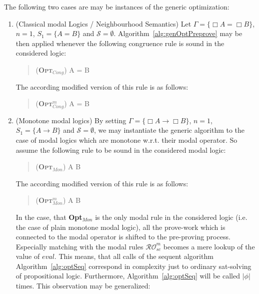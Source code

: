 \documentclass{entcs} \usepackage{entcsmacro}
\begin{document}
\begin{example}
The following two cases are may be instances of the generic optimization:
\begin{enumerate}
\item (Classical modal Logics / Neighbourhood Semantics) Let $\Gamma = \{\Box A = \Box B\}$,
$n=1$, $S_1=\{A=B\}$ and $\mathcal{S}=\emptyset$. Algorithm~\ref{alg:genOptPreprove}
may be then applied whenever the following congruence rule is sound in the considered
logic:
\begin{quote}
\begin{center}
      (\textsc {\textbf{Opt}$_{Cong}$}) 
                      { \Box A = \Box B }
  \end{center}
\end{quote}
The according modified version of this rule is as follows:
\begin{quote}
\begin{center}
      (\textsc {\textbf{Opt}$^m_{Cong}$}) 
                      { \Box A = \Box B }
  \end{center}
\end{quote}

\item (Monotone modal logics) By setting $\Gamma = \{\Box A \rightarrow \Box B\}$,
$n=1$, $S_1=\{A\rightarrow B\}$ and $\mathcal{S}=\emptyset$, we may instantiate
the generic algorithm to the case of modal logics which are monotone w.r.t. their
modal operator. So assume the following rule to be sound in  the considered modal
logic:
\begin{quote}
\begin{center}
      (\textsc {\textbf{Opt}$_{Mon}$}) 
                      { \Box A \rightarrow \Box B }
  \end{center}
\end{quote}
The according modified version of this rule is as follows:
\begin{quote}
\begin{center}
      (\textsc {\textbf{Opt}$^m_{Mon}$}) 
                      { \Box A \rightarrow \Box B }
  \end{center}
\end{quote}
In the case, that \textbf{Opt}$_{Mon}$ is the only modal rule in the
considered logic (i.e. the case of plain monotone modal logic), all the
prove-work which is connected to the modal operator is shifted to the
pre-proving process. Especially matching with the modal rules
$\mathcal{RO}^m_{sc}$ becomes a mere lookup of the value of $eval$.
This means, that all calls of the sequent algorithm Algorithm~\ref{alg:optSeq}
correspond in complexity just to ordinary sat-solving of propositional logic.
Furthermore, Algorithm~\ref{alg:optSeq} will be called $|\phi|$ times. This
observation may be generalized:
\end{enumerate}
\label{ex:neighMon}
\end{example}
\end{document}
